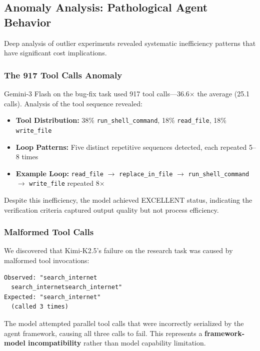 \subsection{Anomaly Analysis: Pathological Agent Behavior}
\label{sec:anomaly}

Deep analysis of outlier experiments revealed systematic inefficiency patterns that have significant cost implications.

\subsubsection{The 917 Tool Calls Anomaly}

Gemini-3 Flash on the bug-fix task used 917 tool calls---36.6$\times$ the average (25.1 calls). Analysis of the tool sequence revealed:

\begin{itemize}
    \item \textbf{Tool Distribution:} 38\% \texttt{run\_shell\_command}, 18\% \texttt{read\_file}, 18\% \texttt{write\_file}
    \item \textbf{Loop Patterns:} Five distinct repetitive sequences detected, each repeated 5--8 times
    \item \textbf{Example Loop:} \texttt{read\_file} $\rightarrow$ \texttt{replace\_in\_file} $\rightarrow$ \texttt{run\_shell\_command} $\rightarrow$ \texttt{write\_file} repeated 8$\times$
\end{itemize}

Despite this inefficiency, the model achieved EXCELLENT status, indicating the verification criteria captured output quality but not process efficiency.

\subsubsection{Malformed Tool Calls}

We discovered that Kimi-K2.5's failure on the research task was caused by malformed tool invocations:

{\small
\begin{verbatim}
Observed: "search_internet
  search_internetsearch_internet"
Expected: "search_internet"
  (called 3 times)
\end{verbatim}
}

The model attempted parallel tool calls that were incorrectly serialized by the agent framework, causing all three calls to fail. This represents a \textbf{framework-model incompatibility} rather than model capability limitation.

